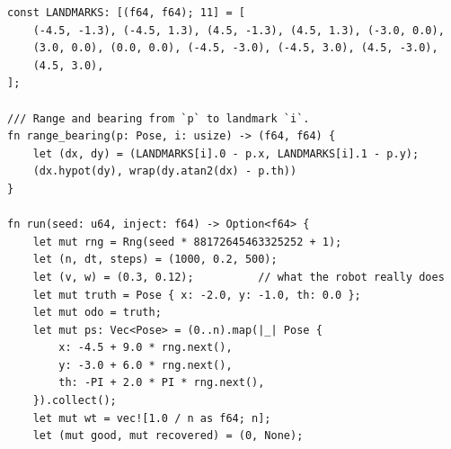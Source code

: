 \begin{enumerate}[label=\textbf{\ansnum.\arabic*}]
\begin{verbatim}
const LANDMARKS: [(f64, f64); 11] = [
    (-4.5, -1.3), (-4.5, 1.3), (4.5, -1.3), (4.5, 1.3), (-3.0, 0.0),
    (3.0, 0.0), (0.0, 0.0), (-4.5, -3.0), (-4.5, 3.0), (4.5, -3.0),
    (4.5, 3.0),
];

/// Range and bearing from `p` to landmark `i`.
fn range_bearing(p: Pose, i: usize) -> (f64, f64) {
    let (dx, dy) = (LANDMARKS[i].0 - p.x, LANDMARKS[i].1 - p.y);
    (dx.hypot(dy), wrap(dy.atan2(dx) - p.th))
}

fn run(seed: u64, inject: f64) -> Option<f64> {
    let mut rng = Rng(seed * 88172645463325252 + 1);
    let (n, dt, steps) = (1000, 0.2, 500);
    let (v, w) = (0.3, 0.12);          // what the robot really does
    let mut truth = Pose { x: -2.0, y: -1.0, th: 0.0 };
    let mut odo = truth;
    let mut ps: Vec<Pose> = (0..n).map(|_| Pose {
        x: -4.5 + 9.0 * rng.next(),
        y: -3.0 + 6.0 * rng.next(),
        th: -PI + 2.0 * PI * rng.next(),
    }).collect();
    let mut wt = vec![1.0 / n as f64; n];
    let (mut good, mut recovered) = (0, None);


\end{verbatim}
\end{enumerate}
